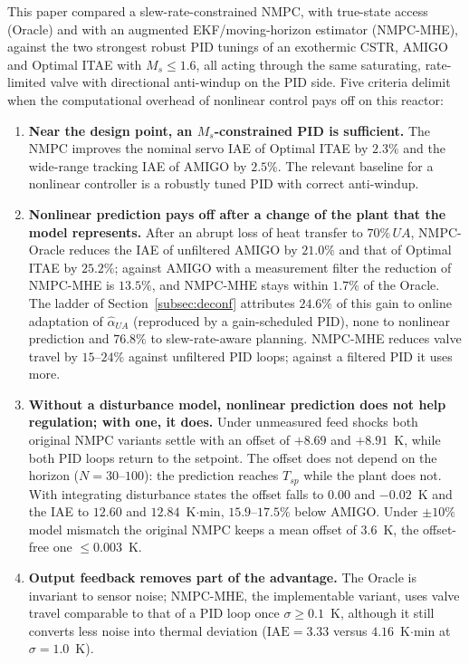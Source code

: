 
This paper compared a slew-rate-constrained NMPC, with true-state access (Oracle) and with an augmented EKF/moving-horizon estimator (NMPC-MHE), against the two strongest robust PID tunings of an exothermic CSTR, AMIGO and Optimal ITAE with $M_s \le 1.6$, all acting through the same saturating, rate-limited valve with directional anti-windup on the PID side. Five criteria delimit when the computational overhead of nonlinear control pays off on this reactor:
\begin{enumerate}
    \item \textbf{Near the design point, an $M_s$-constrained PID is sufficient.} The NMPC improves the nominal servo IAE of Optimal ITAE by $2.3\%$ and the wide-range tracking IAE of AMIGO by $2.5\%$. The relevant baseline for a nonlinear controller is a robustly tuned PID with correct anti-windup.
    \item \textbf{Nonlinear prediction pays off after a change of the plant that the model represents.} After an abrupt loss of heat transfer to $70\%\,UA$, NMPC-Oracle reduces the IAE of unfiltered AMIGO by $21.0\%$ and that of Optimal ITAE by $25.2\%$; against AMIGO with a measurement filter the reduction of NMPC-MHE is $13.5\%$, and NMPC-MHE stays within $1.7\%$ of the Oracle. The ladder of Section~\ref{subsec:deconf} attributes $24.6\%$ of this gain to online adaptation of $\hat\alpha_{UA}$ (reproduced by a gain-scheduled PID), none to nonlinear prediction and $76.8\%$ to slew-rate-aware planning. NMPC-MHE reduces valve travel by $15$--$24\%$ against unfiltered PID loops; against a filtered PID it uses more.
    \item \textbf{Without a disturbance model, nonlinear prediction does not help regulation; with one, it does.} Under unmeasured feed shocks both original NMPC variants settle with an offset of $+8.69$ and $+8.91$~K, while both PID loops return to the setpoint. The offset does not depend on the horizon ($N = 30$--$100$): the prediction reaches $T_{sp}$ while the plant does not. With integrating disturbance states the offset falls to $0.00$ and $-0.02$~K and the IAE to $12.60$ and $12.84$~K$\cdot$min, $15.9$--$17.5\%$ below AMIGO. Under $\pm 10\%$ model mismatch the original NMPC keeps a mean offset of $3.6$~K, the offset-free one $\le 0.003$~K.
    \item \textbf{Output feedback removes part of the advantage.} The Oracle is invariant to sensor noise; NMPC-MHE, the implementable variant, uses valve travel comparable to that of a PID loop once $\sigma \ge 0.1$~K, although it still converts less noise into thermal deviation ($\mathrm{IAE} = 3.33$ versus $4.16$~K$\cdot$min at $\sigma = 1.0$~K).

\end{enumerate}
